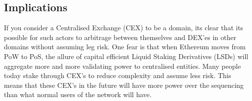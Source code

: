 \subsection{Implications}

If you consider a Centralised Exchange (CEX) to be a domain, its clear that its possible for such actors to arbitrage between themselves and DEX'es in other domains without assuming leg risk. One fear is that when Ethereum moves from PoW to PoS, the allure of capital efficient Liquid Staking Derivatives (LSDs) will aggregate more and more validating power to centralised entities. Many people today stake through CEX's to reduce complexity and assume less risk. This means that these CEX's in the future will have more power over the sequencing than what normal users of the network will have. 